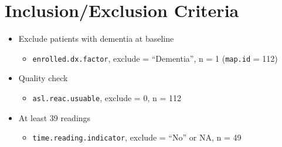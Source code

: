 \documentclass[10pt]{article}\usepackage[]{graphicx}\usepackage[]{color}
\newcommand{\code}[1]{\texttt{\smaller #1}}
\begin{document}
\clearpage

\section{Inclusion/Exclusion Criteria}

\begin{itemize}
  \item Exclude patients with dementia at baseline
  \begin{itemize}
      \item \code{enrolled.dx.factor}, exclude = ``Dementia'', n = 1 (\code{map.id} = 112)
  \end{itemize} 
  \item Quality check
  \begin{itemize}
    \item \code{asl.reac.usuable}, exclude = 0, n = 112
  \end{itemize}
  \item At least 39 readings
  \begin{itemize}
    \item \code{time.reading.indicator}, exclude = ``No'' or NA, n = 49
  \end{itemize}  
\end{itemize}
\end{document}
